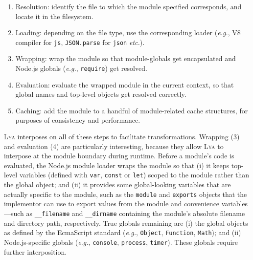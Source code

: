 \documentclass[letterpaper,twocolumn,10pt]{article}
\def\eg{{\em e.g.}, }
\def\etc{{\em etc.}\xspace}
\newcommand{\ttt}[1]{\texttt{#1}}
\newcommand{\sys}{{\scshape Lya}\xspace}
\begin{document}
\begin{enumerate}
\item Resolution: identify the file to which the module specified corresponds, and locate it in the filesystem.
\item Loading: depending on the file type, use the corresponding loader (\eg V8 compiler for \ttt{js}, \ttt{JSON.parse} for \ttt{json} \etc).
\item Wrapping: wrap the module so that module-globals get encapsulated and Node.js globals (\eg \ttt{require}) get resolved.
\item Evaluation: evaluate the wrapped module in the current context, so that global names and top-level objects get resolved correctly.
\item Caching: add the module to a handful of module-related cache structures, for purposes of consistency and performance.
\end{enumerate}

\sys interposes on all of these steps to facilitate transformations.
Wrapping (3) and evaluation (4) are particularly interesting, because they allow \sys to interpose at the module boundary during runtime.
Before a module's code is evaluated, the Node.js module loader wraps the module so that
  (i) it keeps top-level variables (defined with \ttt{var}, \ttt{const} or \ttt{let}) scoped to the module rather than the global object; and
  (ii) it provides some global-looking variables that are actually specific to the module, such as the \ttt{module} and \ttt{exports} objects that the implementor can use to export values from the module and convenience variables---such as \ttt{\_\_filename} and \ttt{\_\_dirname}  containing the module's absolute filename and directory path, respectively.
True globals remaining are
  (i) the global objects as defined by the EcmaScript standard (\eg \ttt{Object}, \ttt{Function}, \ttt{Math}); and
  (ii) Node.js-specific globals (\eg \ttt{console}, \ttt{process}, \ttt{timer}).
These globals require further interposition.

\end{document}
